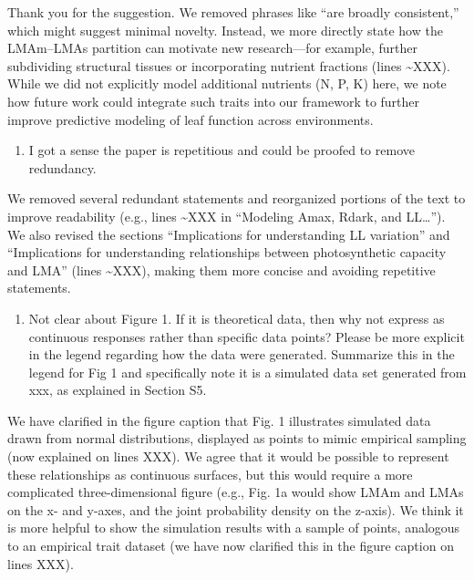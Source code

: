 \documentclass[
  12pt,
  letterpaper,
  DIV=11,
  numbers=noendperiod]{scrartcl}
\providecommand{\tightlist}{%
  \setlength{\itemsep}{0pt}\setlength{\parskip}{0pt}}\usepackage{longtable,booktabs,array}
\renewenvironment{quote}
  {\begin{customblockquote}\color{blockquote-text}\ignorespaces}
  {\end{customblockquote}}
\begin{document}
Thank you for the suggestion. We removed phrases like ``are broadly
consistent,'' which might suggest minimal novelty. Instead, we more
directly state how the LMAm--LMAs partition can motivate new
research---for example, further subdividing structural tissues or
incorporating nutrient fractions (lines \textasciitilde XXX). While we
did not explicitly model additional nutrients (N, P, K) here, we note
how future work could integrate such traits into our framework to
further improve predictive modeling of leaf function across
environments.

\begin{quote}
\begin{enumerate}
\def\labelenumi{\arabic{enumi})}
\setcounter{enumi}{4}
\tightlist
\item
  I got a sense the paper is repetitious and could be proofed to remove
  redundancy.
\end{enumerate}
\end{quote}

We removed several redundant statements and reorganized portions of the
text to improve readability (e.g., lines \textasciitilde XXX in
``Modeling Amax, Rdark, and LL\ldots{}''). We also revised the sections
``Implications for understanding LL variation'' and ``Implications for
understanding relationships between photosynthetic capacity and LMA''
(lines \textasciitilde XXX), making them more concise and avoiding
repetitive statements.

\begin{quote}
\begin{enumerate}
\def\labelenumi{\arabic{enumi})}
\setcounter{enumi}{5}
\tightlist
\item
  Not clear about Figure 1. If it is theoretical data, then why not
  express as continuous responses rather than specific data points?
  Please be more explicit in the legend regarding how the data were
  generated. Summarize this in the legend for Fig 1 and specifically
  note it is a simulated data set generated from xxx, as explained in
  Section S5.
\end{enumerate}
\end{quote}

We have clarified in the figure caption that Fig. 1 illustrates
simulated data drawn from normal distributions, displayed as points to
mimic empirical sampling (now explained on lines XXX). We agree that it
would be possible to represent these relationships as continuous
surfaces, but this would require a more complicated three-dimensional
figure (e.g., Fig. 1a would show LMAm and LMAs on the x- and y-axes, and
the joint probability density on the z-axis). We think it is more
helpful to show the simulation results with a sample of points,
analogous to an empirical trait dataset (we have now clarified this in
the figure caption on lines XXX).
\end{document}
